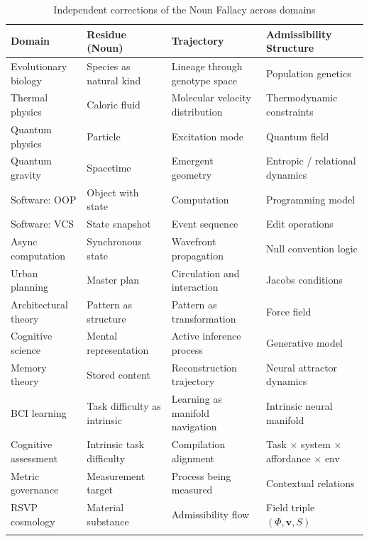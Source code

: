 \documentclass[12pt, a4paper]{article}
\theoremstyle{plain}
\theoremstyle{definition}
\theoremstyle{remark}
\begin{document}
\begin{longtable}{p{} p{} p{} p{}}
\toprule
\textbf{Domain} & \textbf{Residue (Noun)} & \textbf{Trajectory} & \textbf{Admissibility Structure} \\
\midrule
\endhead
Evolutionary biology & Species as natural kind & Lineage through genotype space & Population genetics \\[0.5em]
Thermal physics & Caloric fluid & Molecular velocity distribution & Thermodynamic constraints \\[0.5em]
Quantum physics & Particle & Excitation mode & Quantum field \\[0.5em]
Quantum gravity & Spacetime & Emergent geometry & Entropic / relational dynamics \\[0.5em]
Software: OOP & Object with state & Computation & Programming model \\[0.5em]
Software: VCS & State snapshot & Event sequence & Edit operations \\[0.5em]
Async computation & Synchronous state & Wavefront propagation & Null convention logic \\[0.5em]
Urban planning & Master plan & Circulation and interaction & Jacobs conditions \\[0.5em]
Architectural theory & Pattern as structure & Pattern as transformation & Force field \\[0.5em]
Cognitive science & Mental representation & Active inference process & Generative model \\[0.5em]
Memory theory & Stored content & Reconstruction trajectory & Neural attractor dynamics \\[0.5em]
BCI learning & Task difficulty as intrinsic & Learning as manifold navigation & Intrinsic neural manifold \citep{busch2026} \\[0.5em]
Cognitive assessment & Intrinsic task difficulty & Compilation alignment & Task $\times$ system $\times$ affordance $\times$ env \\[0.5em]
Metric governance & Measurement target & Process being measured & Contextual relations \\[0.5em]
RSVP cosmology & Material substance & Admissibility flow & Field triple $(\Phi, \mathbf{v}, S)$ \\[0.5em]
\bottomrule
\caption{Independent corrections of the Noun Fallacy across domains}
\label{tab:corrections}
\end{longtable}
\end{document}
